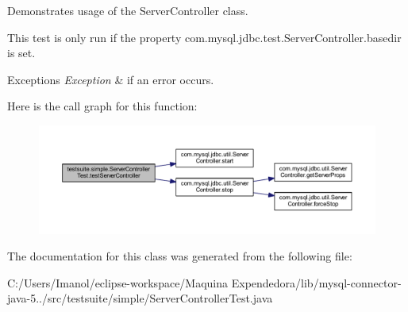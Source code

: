 Demonstrates usage of the Server\+Controller class.

This test is only run if the property \textquotesingle{}com.\+mysql.\+jdbc.\+test.\+Server\+Controller.\+basedir\textquotesingle{} is set.


\begin{DoxyExceptions}{Exceptions}
{\em Exception} & if an error occurs. \\
\hline
\end{DoxyExceptions}
Here is the call graph for this function\+:
\nopagebreak
\begin{figure}[H]
\begin{center}
\leavevmode
\includegraphics[width=350pt]{classtestsuite_1_1simple_1_1_server_controller_test_a8a596dbd3bd3be8d4e90da85076c393e_cgraph}
\end{center}
\end{figure}


The documentation for this class was generated from the following file\+:\begin{DoxyCompactItemize}
\item 
C\+:/\+Users/\+Imanol/eclipse-\/workspace/\+Maquina Expendedora/lib/mysql-\/connector-\/java-\/5../src/testsuite/simple/Server\+Controller\+Test.\+java\end{DoxyCompactItemize}
